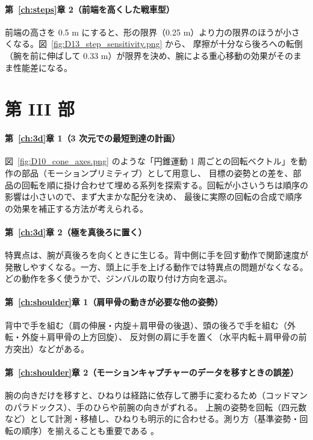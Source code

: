 \paragraph{第~\ref{ch:steps}章 2（前端を高くした戦車型）}
前端の高さを 0.5 m にすると、形の限界（0.25 m）より力の限界のほうが小さくなる。図~\ref{fig:D13_step_sensitivity.png} から、
摩擦が十分なら後ろへの転倒（腕を前に伸ばして 0.33 m）が限界を決め、腕による重心移動の効果がそのまま性能差になる。

\section{第 III 部}

\paragraph{第~\ref{ch:3d}章 1（3 次元での最短到達の計画）}
図~\ref{fig:D10_cone_axes.png} のような「円錐運動 1 周ごとの回転ベクトル」を動作の部品（モーションプリミティブ）として用意し、
目標の姿勢との差を、部品の回転を順に掛け合わせて埋める系列を探索する。回転が小さいうちは順序の影響は小さいので、まず大まかな配分を決め、
最後に実際の回転の合成で順序の効果を補正する方法が考えられる。

\paragraph{第~\ref{ch:3d}章 2（極を真後ろに置く）}
特異点は、腕が真後ろを向くときに生じる。背中側に手を回す動作で関節速度が発散しやすくなる。一方、頭上に手を上げる動作では特異点の問題がなくなる。
どの動作を多く使うかで、ジンバルの取り付け方向を選ぶ。

\paragraph{第~\ref{ch:shoulder}章 1（肩甲骨の動きが必要な他の姿勢）}
背中で手を組む（肩の伸展・内旋＋肩甲骨の後退）、頭の後ろで手を組む（外転・外旋＋肩甲骨の上方回旋）、
反対側の肩に手を置く（水平内転＋肩甲骨の前方突出）などがある。

\paragraph{第~\ref{ch:shoulder}章 2（モーションキャプチャーのデータを移すときの誤差）}
腕の向きだけを移すと、ひねりは経路に依存して勝手に変わるため（コッドマンのパラドックス）、手のひらや前腕の向きがずれる。
上腕の姿勢を回転（四元数など）として計測・移植し、ひねりも明示的に合わせる。測り方（基準姿勢・回転の順序）を揃えることも重要である \cite{R36}。
